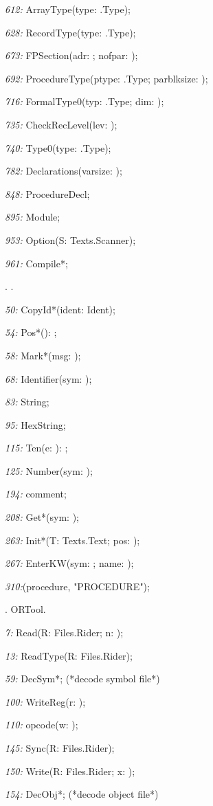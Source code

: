 \item{\it 612:} ArrayType(\VAR type: \ORB.Type);
\item{\it 628:} RecordType(\VAR type: \ORB.Type);
\item{\it 673:} FPSection(\VAR adr: \LONGINT; \VAR nofpar: \INTEGER);
\item{\it 692:} ProcedureType(ptype: \ORB.Type; \VAR parblksize: \LONGINT);
\item{\it 716:} FormalType0(\VAR typ: \ORB.Type; dim: \INTEGER);
\item{\it 735:} CheckRecLevel(lev: \INTEGER);
\item{\it 740:} Type0(\VAR type: \ORB.Type);
\item{\it 782:} Declarations(\VAR varsize: \LONGINT);
\item{\it 848:} ProcedureDecl;
\item{\it 895:} Module;
\item{\it 953:} Option(\VAR S: Texts.Scanner);
\item{\it 961:} Compile*;

. \ORS.

\item{\it 50:} CopyId*(\VAR ident: Ident);
\item{\it 54:} Pos*(): \LONGINT;
\item{\it 58:} Mark*(msg: \ARRAYOF\CHAR);
\item{\it 68:} Identifier(\VAR sym: \INTEGER);
\item{\it 83:} String;
\item{\it 95:} HexString;
\item{\it 115:} Ten(e: \LONGINT): \REAL;
\item{\it 125:} Number(\VAR sym: \INTEGER);
\item{\it 194:} comment;
\item{\it 208:} Get*(\VAR sym: \INTEGER);
\item{\it 263:} Init*(T: Texts.Text; pos: \LONGINT);
\item{\it 267:} EnterKW(sym: \INTEGER; name: \ARRAYOF\CHAR);
\item{\it 310:}(procedure, "PROCEDURE");

. ORTool.

\item{\it 7:} Read(\VAR R: Files.Rider; \VAR n: \INTEGER);
\item{\it 13:} ReadType(\VAR R: Files.Rider);
\item{\it 59:} DecSym*;  (*decode symbol file*)
\item{\it 100:} WriteReg(r: \LONGINT);
\item{\it 110:} opcode(w: \LONGINT);
\item{\it 145:} Sync(\VAR R: Files.Rider);
\item{\it 150:} Write(\VAR R: Files.Rider; x: \INTEGER);
\item{\it 154:} DecObj*;   (*decode object file*)

